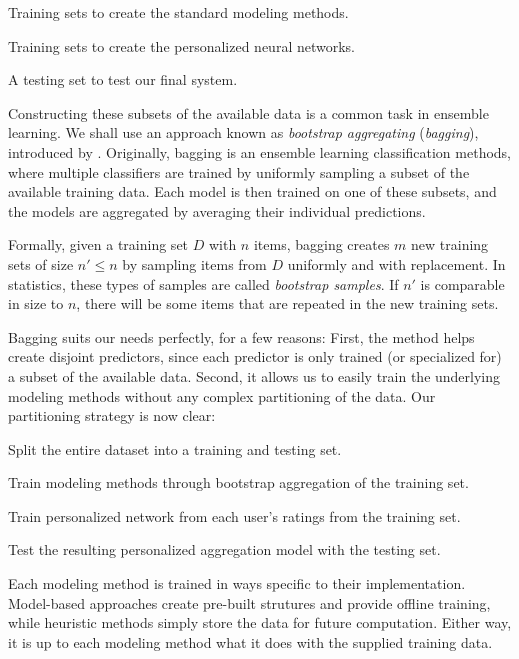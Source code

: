 \begin{enumerate*}
  \item Training sets to create the standard modeling methods.
  \item Training sets to create the personalized neural networks.
  \item A testing set to test our final system.
\end{enumerate*}

Constructing these subsets of the available data is a common task in ensemble learning.
We shall use an approach known as  \emph{bootstrap aggregating} (\emph{bagging}),
introduced by \cite{Breiman1996}.
Originally, bagging is an ensemble learning classification methods, where multiple classifiers are 
trained by uniformly sampling a subset of the available training data. 
Each model is then trained on one of these subsets, and the models are aggregated by averaging their individual predictions.

Formally, given a training set $D$ with $n$ items, bagging creates $m$ new training sets of size $n' \leq n$ by sampling
items from $D$ uniformly and with replacement. 
In statistics, these types of samples are called \emph{bootstrap samples}.
If $n'$ is comparable in size to $n$, there will be some items
that are repeated in the new training sets.

Bagging suits our needs perfectly, for a few reasons: First, the method helps create disjoint predictors, 
since each predictor is only trained (or specialized for) a subset of the available data.
Second, it allows us to easily train the underlying modeling methods without any complex partitioning of the data.
Our partitioning strategy is now clear:

\begin{enumerate*}
  \item Split the entire dataset into a training and testing set.
  \item Train modeling methods through bootstrap aggregation of the training set.
  \item Train personalized network from each user's ratings from the training set.
  \item Test the resulting personalized aggregation model with the testing set.
\end{enumerate*}

Each modeling method is trained in ways specific to their implementation. 
Model-based approaches create pre-built strutures and provide offline training,
while heuristic methods simply store the data for future computation.
Either way, it is up to each modeling method what it does with the supplied training data.

